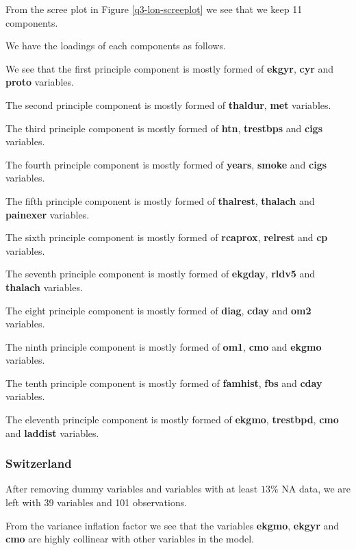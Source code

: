 \documentclass[a4paper]{article}
\begin{document}
From the scree plot in Figure \ref{q3-lon-screeplot} we see that we keep 11
components.

We have the loadings of each components as follows.



We see that the first principle component is mostly formed of \textbf{ekgyr},
\textbf{cyr} and \textbf{proto} variables.

The second principle component is mostly formed of \textbf{thaldur},
\textbf{met} variables.

The third principle component is mostly formed of \textbf{htn},
\textbf{trestbps} and \textbf{cigs} variables.

The fourth principle component is mostly formed of \textbf{years},
\textbf{smoke} and \textbf{cigs} variables.

The fifth principle component is mostly formed of \textbf{thalrest},
\textbf{thalach} and \textbf{painexer} variables.

The sixth principle component is mostly formed of \textbf{rcaprox},
\textbf{relrest} and \textbf{cp} variables.

The seventh principle component is mostly formed of \textbf{ekgday},
\textbf{rldv5} and \textbf{thalach} variables.

The eight principle component is mostly formed of \textbf{diag}, \textbf{cday}
and \textbf{om2} variables.

The ninth principle component is mostly formed of \textbf{om1}, \textbf{cmo} and
\textbf{ekgmo} variables.

The tenth principle component is mostly formed of \textbf{famhist}, \textbf{fbs}
and \textbf{cday} variables.

The eleventh principle component is mostly formed of \textbf{ekgmo},
\textbf{trestbpd}, \textbf{cmo} and \textbf{laddist} variables.

\subsubsection{Switzerland}

After removing dummy variables and variables with at least $13\%$ NA data, we
are left with 39 variables and 101 observations.



From the variance inflation factor we see that the variables \textbf{ekgmo},
\textbf{ekgyr} and \textbf{cmo} are highly collinear with other variables in the
model.
\end{document}
